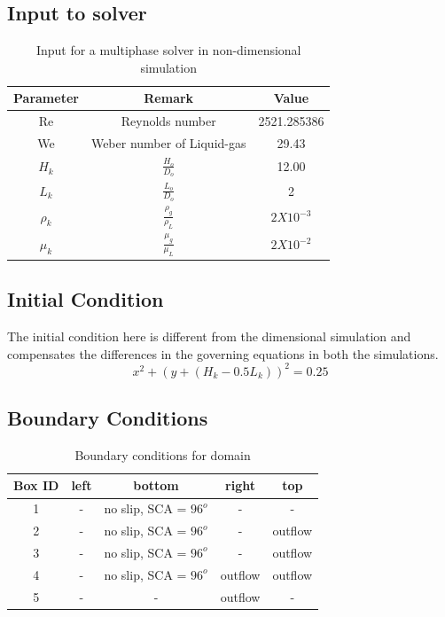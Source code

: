 \subsection{Input to solver}
\begin{table}[H]
\centering
 \caption{Input for a multiphase solver in non-dimensional simulation}
\begin{tabular}{||c c c||}
\hline
 Parameter & Remark & Value  \\ 
 \hline\hline
 Re & Reynolds number & 2521.285386 \\
\hline
 We & Weber number of Liquid-gas & 29.43 \\
 \hline
 $H_k$ & $\frac{H_o}{D_o}$ &  12.00\\
 \hline
 $L_k$ & $\frac{L_o}{D_o}$ &  2 \\
 \hline
 $\rho_k$ & $\frac{\rho_g}{\rho_L}$ & $2 X 10^{-3}$  \\ 
 \hline
 $\mu_k$ & $\frac{\mu_g}{\mu_L}$ & $2 X 10^{-2}$ \\
 \hline
 \end{tabular}
 \end{table}


\subsection{Initial Condition}
The initial condition here is different from the dimensional simulation and compensates the differences in the governing
equations in both the simulations.
\begin{equation}
 x^2+(y+(H_k-0.5L_k))^2=0.25  %
\end{equation}

\subsection{Boundary Conditions}
\begin{table}[H]
\centering
\caption{Boundary conditions for domain}
\begin{tabular}{||c c c c c||}
\hline
 Box ID & left & bottom & right & top  \\ 
 \hline\hline
 1 & - & no slip, SCA = $96^o$ & - & -  \\ 
 \hline
 2 & - & no slip, SCA = $96^o$ & - & outflow  \\ 
 \hline
 3 & - & no slip, SCA = $96^o$ & - & outflow  \\ 
 \hline
 4 & - & no slip, SCA = $96^o$ & outflow & outflow  \\ 
 \hline
 5 & - & - & outflow & -  \\ 
 \hline
\end{tabular}
\end{table}
\pagebreak
